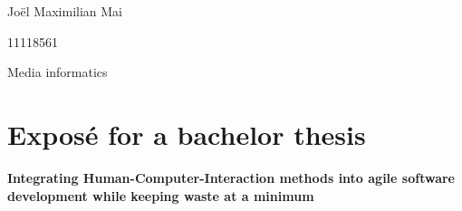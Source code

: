 \begin{titlepage}
Joël Maximilian Mai 
\vspace{0.1cm}

11118561 
\vspace{0.1cm}

Media informatics 
\vspace{2cm}

\section*{Exposé for a bachelor thesis}
\vspace{0.4cm}

\begin{LARGE}
\textbf{Integrating Human-Computer-Interaction methods into agile software development while keeping waste at a minimum} 	
\end{LARGE}

\vspace{2cm}
\tableofcontents

\end{titlepage}